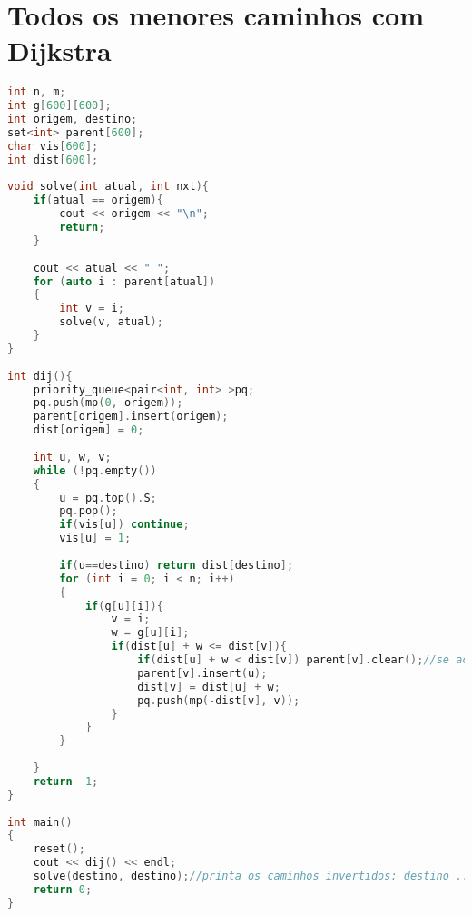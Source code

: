 \documentclass[12pt,a4paper,twoside]{report}
\begin{document}
\section{Todos os menores caminhos com Dijkstra}
\noindent\begin{lstlisting}[caption=Todos os menores caminhos com Dijkstra,language=C++]
int n, m;
int g[600][600];
int origem, destino;
set<int> parent[600];
char vis[600];
int dist[600];
 
void solve(int atual, int nxt){
    if(atual == origem){
        cout << origem << "\n";
        return;
    }
     
    cout << atual << " ";
    for (auto i : parent[atual])
    {
        int v = i;
        solve(v, atual);
    }
}
 
int dij(){
    priority_queue<pair<int, int> >pq;
    pq.push(mp(0, origem));
    parent[origem].insert(origem);
    dist[origem] = 0;
     
    int u, w, v;
    while (!pq.empty())
    {
        u = pq.top().S;
        pq.pop();
        if(vis[u]) continue;
        vis[u] = 1;
         
        if(u==destino) return dist[destino];
        for (int i = 0; i < n; i++)
        {
            if(g[u][i]){
                v = i;
                w = g[u][i];
                if(dist[u] + w <= dist[v]){
                    if(dist[u] + w < dist[v]) parent[v].clear();//se achou caminho menor: limpa vetor de parent
                    parent[v].insert(u);
                    dist[v] = dist[u] + w;
                    pq.push(mp(-dist[v], v));
                }
            }
        }
         
    }
    return -1;
}
 
int main()
{
    reset();
    cout << dij() << endl;
    solve(destino, destino);//printa os caminhos invertidos: destino ... origem
    return 0;
}
\end{lstlisting}
\end{document}
